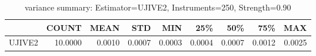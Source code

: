 \begin{table}[ht]
\centering
\caption{variance summary: Estimator=UJIVE2, Instruments=250, Strength=0.90}
\begin{tabular}{lrrrrrrrr}
\toprule
 & COUNT & MEAN & STD & MIN & 25\% & 50\% & 75\% & MAX \\
\midrule
UJIVE2 & 10.0000 & 0.0010 & 0.0007 & 0.0003 & 0.0004 & 0.0007 & 0.0012 & 0.0025 \\
\bottomrule
\end{tabular}
\end{table}
